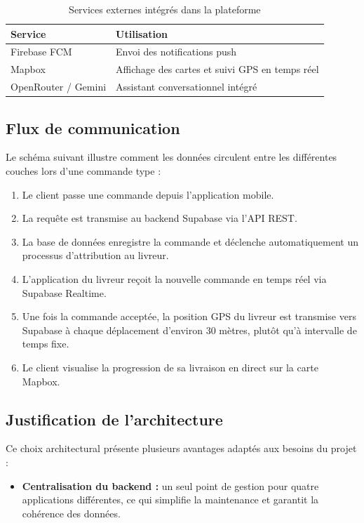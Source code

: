 \documentclass[12pt,fleqn,a4paper]{report}
\begin{document}
\begin{justify}
\begin{table}[H]
\centering
\renewcommand{\arraystretch}{1.4}
\begin{tabular}{|l|l|}
\hline
\textbf{Service} & \textbf{Utilisation} \\
\hline
Firebase FCM & Envoi des notifications push \\
\hline
Mapbox & Affichage des cartes et suivi GPS en temps réel \\
\hline
OpenRouter / Gemini & Assistant conversationnel intégré \\
\hline
\end{tabular}
\caption{Services externes intégrés dans la plateforme}
\end{table}

\subsection{Flux de communication}

Le schéma suivant illustre comment les données circulent entre
les différentes couches lors d'une commande type :

\begin{enumerate}
    \item Le client passe une commande depuis l'application mobile.
    \item La requête est transmise au backend Supabase via l'API REST.
    \item La base de données enregistre la commande et déclenche
    automatiquement un processus d'attribution au livreur.
    \item L'application du livreur reçoit la nouvelle commande
    en temps réel via Supabase Realtime.
    \item Une fois la commande acceptée, la position GPS du livreur
    est transmise vers Supabase à chaque déplacement d'environ
    30 mètres, plutôt qu'à intervalle de temps fixe.
    \item Le client visualise la progression de sa livraison
    en direct sur la carte Mapbox.
\end{enumerate}

\subsection{Justification de l'architecture}

Ce choix architectural présente plusieurs avantages adaptés
aux besoins du projet :

\begin{itemize}
    \item \textbf{Centralisation du backend :} un seul point
    de gestion pour quatre applications différentes, ce qui
    simplifie la maintenance et garantit la cohérence des données.


\end{itemize}
\end{justify}
\end{document}
